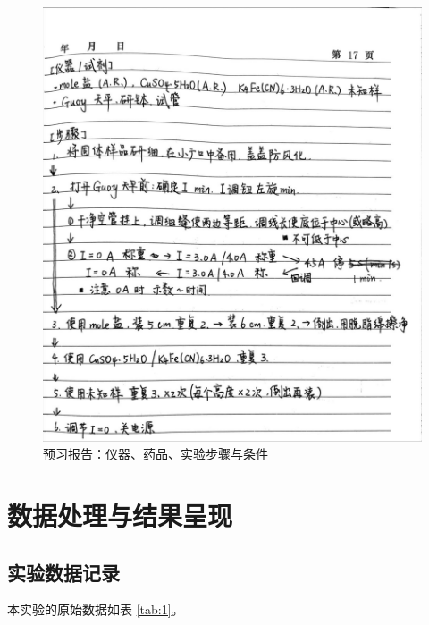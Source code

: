 \documentclass[cn,hazy,pku,12pt,normal,math=newtx,cite=super]{elegantnote}
\begin{document}
\begin{figure}[H]
    \centering
    \includegraphics[width=.85\textwidth]{figures/0-3.jpg}
    \caption{预习报告：仪器、药品、实验步骤与条件}
\end{figure}
\newpage





\section{数据处理与结果呈现}

\subsection{实验数据记录}

本实验的原始数据如表 \ref{tab:1}。
\end{document}
